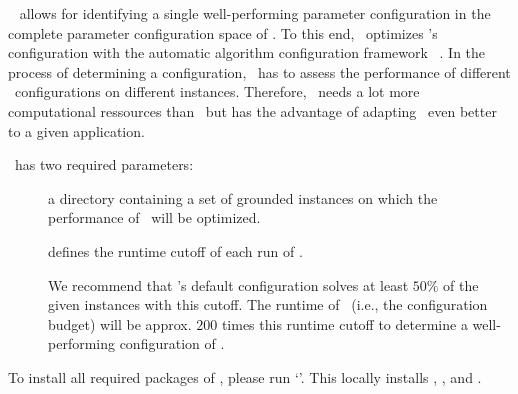 \piclasp\ %
allows for identifying a single well-performing parameter configuration 
in the complete parameter configuration space of \clasp.
To this end, \piclasp\ optimizes \clasp's configuration with the automatic algorithm configuration framework \smac~\cite{huhole11b}.
In the process of determining a configuration,
\piclasp\ has to assess the performance of different \clasp\ configurations on different instances. 
Therefore, \piclasp\ needs a lot more computational ressources than \claspfolio\
but has the advantage of adapting \clasp\ even better to a given application.
 
\piclasp\ has two required parameters:
%
\begin{description}
  \item[] a directory containing a set of grounded instances on which the performance of \clasp\ will be optimized.
  \item[\code{--cutoff,-c}] defines the runtime cutoff of each run of \clasp. 

  		We recommend that \clasp's default configuration solves at least $50\%$ of the given instances with this cutoff.
  		The runtime of \piclasp\ (i.e., the configuration budget) will be approx. $200$ times this runtime cutoff 
  		to determine a well-performing configuration of \clasp.
\end{description} 

To install all required packages of \piclasp, please run `'.
This locally installs \clasp, \smac, \sysfont{runsolver} and \claspre.

